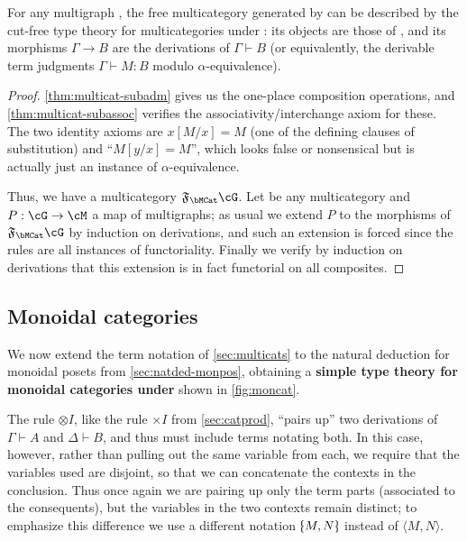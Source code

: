 \documentclass{book}
\let\types\vdash
\newcommand{\F}[1]{\mathfrak{F}_{#1}}
\def\timesI{\ensuremath{\mathord{\times}I}}
\def\pair#1#2{\langle #1,#2\rangle}
\let\tensor\otimes
\def\tensorI{\mathord{\tensor}I}
\def\tpair#1#2{\text{\textlquill} #1,#2 \text{\textrquill}}%
\begin{document}
\begin{thm}\label{thm:multicat-initial}
  For any multigraph \cG, the free multicategory generated by \cG can be described by the cut-free type theory for multicategories under \cG: its objects are those of \cG, and its morphisms $\Gamma\to B$ are the derivations of $\Gamma\types B$ (or equivalently, the derivable term judgments $\Gamma\types M:B$ modulo $\alpha$-equivalence).
\end{thm}
\begin{proof}
  \cref{thm:multicat-subadm} gives us the one-place composition operations, and \cref{thm:multicat-subassoc} verifies the associativity/interchange axiom for these.
  The two identity axioms are $x[M/x]=M$ (one of the defining clauses of substitution) and ``$M[y/x] = M$'', which looks false or nonsensical but is actually just an instance of $\alpha$-equivalence.

  Thus, we have a multicategory $\F\bMCat\cG$.
  Let \cM be any multicategory and $P:\cG\to\cM$ a map of multigraphs; as usual we extend $P$ to the morphisms of $\F\bMCat\cG$ by induction on derivations, and such an extension is forced since the rules are all instances of functoriality.
  Finally we verify by induction on derivations that this extension is in fact functorial on all composites.
\end{proof}


\subsection{Monoidal categories}
\label{sec:moncat}

We now extend the term notation of \cref{sec:multicats} to the natural deduction for monoidal posets from \cref{sec:natded-monpos}, obtaining a \textbf{simple type theory for monoidal categories under \cG} shown in \cref{fig:moncat}.

The rule $\tensorI$, like the rule $\timesI$ from \cref{sec:catprod}, ``pairs up'' two derivations of $\Gamma\types A$ and $\Delta\types B$, and thus must include terms notating both.
In this case, however, rather than pulling out the same variable from each, we require that the variables used are disjoint, so that we can concatenate the contexts in the conclusion.
Thus once again we are pairing up only the term parts (associated to the consequents), but the variables in the two contexts remain distinct; to emphasize this difference we use a different notation $\tpair M N$ instead of $\pair M N$.
\end{document}
